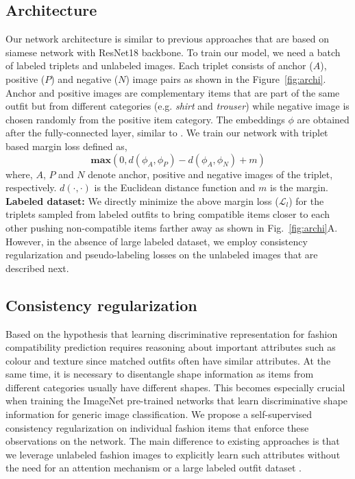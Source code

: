 \documentclass[sigconf]{acmart}
\begin{document}
\subsection{Architecture} Our network architecture is similar to previous approaches \cite{eccv2018learning} that are based on siamese network \cite{siamese2017} with ResNet18 backbone. To train our model, we need a batch of labeled triplets and unlabeled images. Each triplet consists of anchor ($A$), positive ($P$) and negative ($N$) image pairs as shown in the Figure~\ref{fig:archi}. Anchor and positive images are complementary items that are part of the same outfit but from different categories (e.g. {\em shirt} and {\em trouser}) while negative image is chosen randomly from the positive item category. The embeddings $\phi$ are obtained after the fully-connected layer, similar to \cite{eccv2018learning}. We train our network with triplet based margin loss defined as,
\begin{equation}
    \mathbf{max}(0, d(\phi_A, \phi_P) - d(\phi_A, \phi_N) + m) 
\end{equation}
where, $A$, $P$ and $N$ denote anchor, positive and negative images of the triplet, respectively. $d(\cdot, \cdot)$ is the Euclidean distance function and $m$ is the margin.\\

{\bf Labeled dataset:} We directly minimize the above margin loss ($\mathcal{L}_l$) for the triplets sampled from labeled outfits to bring compatible items closer to each other pushing non-compatible items farther away as shown in Fig.~\ref{fig:archi}{A}. However, in the absence of large labeled dataset, we employ consistency regularization and pseudo-labeling losses on the unlabeled images that are described next.



\subsection{Consistency regularization}

\label{sec:l_ss}

Based on the hypothesis that learning discriminative representation for fashion compatibility prediction requires reasoning about important attributes such as colour and texture since matched outfits often have similar attributes. At the same time, it is necessary to disentangle shape information as items from different categories usually have different shapes. This becomes especially crucial when training the ImageNet pre-trained networks that learn discriminative shape information \cite{simclr, moco} for generic image classification. We propose a self-supervised consistency regularization on individual fashion items that enforce these observations on the network. The main difference to existing approaches is that we leverage unlabeled fashion images to explicitly learn such attributes without the need for an attention mechanism \cite{iccv2019learning} or a large labeled outfit dataset \cite{iccv2019learning,cvpr2020fashion}.
\end{document}
